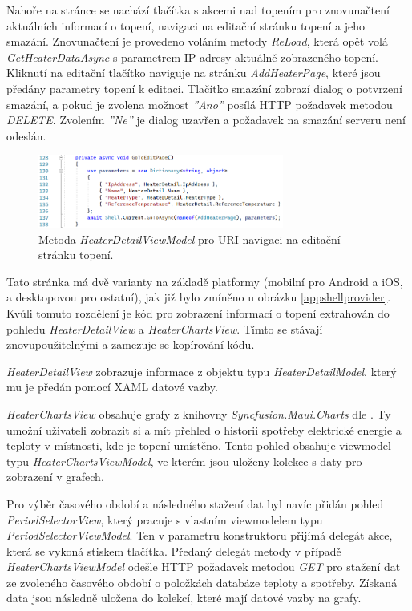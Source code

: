Nahoře na stránce se nachází tlačítka s akcemi nad topením pro znovunačtení aktuálních informací o topení, navigaci na editační stránku topení a jeho smazání. Znovunačtení je provedeno voláním metody {\it ReLoad}, která opět volá {\it GetHeaterDataAsync} s parametrem IP adresy aktuálně zobrazeného topení. Kliknutí na editační tlačítko naviguje na stránku {\it AddHeaterPage}, které jsou předány parametry topení k editaci. Tlačítko smazání zobrazí dialog o potvrzení smazání, a pokud je zvolena možnost {\it ''Ano''} posílá HTTP požadavek metodou {\it DELETE}. Zvolením {\it ''Ne''} je dialog uzavřen a požadavek na smazání serveru není odeslán.

\begin{figure}[hbt]
\includegraphics[width=0.72\textwidth]{obrazky-figures/code-gotoedit.png}
\caption{Metoda {\it HeaterDetailViewModel} pro URI navigaci na editační stránku topení.}
\end{figure}

Tato stránka má dvě varianty na základě platformy (mobilní pro Android a iOS, a desktopovou pro ostatní), jak již bylo zmíněno u obrázku \ref{appshellprovider}. Kvůli tomuto rozdělení je kód pro zobrazení informací o topení extrahován do pohledu {\it HeaterDetailView} a {\it HeaterChartsView}. Tímto se stávají znovupoužitelnými a zamezuje se kopírování kódu.

{\it HeaterDetailView} zobrazuje informace z objektu typu {\it HeaterDetailModel}, který mu je předán pomocí XAML datové vazby.

{\it HeaterChartsView} obsahuje grafy z knihovny {\it Syncfusion.Maui.Charts} dle \cite{maui-charts}. Ty umožní uživateli zobrazit si a mít přehled o historii spotřeby elektrické energie a teploty v místnosti, kde je topení umístěno. Tento pohled obsahuje viewmodel typu {\it HeaterChartsViewModel}, ve kterém jsou uloženy kolekce s daty pro zobrazení v grafech.

Pro výběr časového období a následného stažení dat byl navíc přidán pohled {\it PeriodSelectorView}, který pracuje s vlastním viewmodelem typu {\it PeriodSelectorViewModel}. Ten v parametru konstruktoru přijímá delegát akce, která se vykoná stiskem tlačítka. Předaný delegát metody v případě {\it HeaterChartsViewModel} odešle HTTP požadavek metodou {\it GET} pro stažení dat ze zvoleného časového období o položkách databáze teploty a spotřeby. Získaná data jsou následně uložena do kolekcí, které mají datové vazby na grafy.

